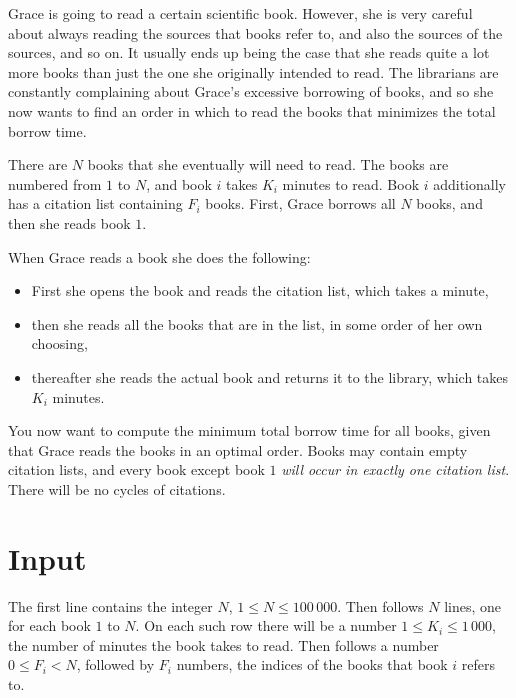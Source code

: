 
Grace is going to read a certain scientific book. However, she is very careful about always reading the sources that books refer to, and also the sources of the sources, and so on. It usually ends up being the case that she reads quite a lot more books than just the one she originally intended to read. The librarians are constantly complaining about Grace's excessive borrowing of books, and so she now wants to find an order in which to read the books that minimizes the total borrow time.

There are $N$ books that she eventually will need to read. The books are numbered from $1$ to $N$, and book $i$ takes $K_i$ minutes to read. Book $i$ additionally has a citation list containing $F_i$ books. First, Grace borrows all $N$ books, and then she reads book $1$.

When Grace reads a book she does the following:

\begin{itemize}
\item First she opens the book and reads the citation list, which takes a minute,
\item then she reads all the books that are in the list, in some order of her own choosing,
\item thereafter she reads the actual book and returns it to the library, which takes $K_i$ minutes.
\end{itemize}

You now want to compute the minimum total borrow time for all books, given that Grace reads the books in an optimal order. Books may contain empty citation lists, and every book except book $1$ {\em will occur in exactly one citation list}. There will be no cycles of citations.

\section*{Input}
The first line contains the integer $N$, $1 \leq N \leq 100\,000$. Then follows $N$ lines, one for each book $1$ to $N$. On each such row there will be a number $1 \leq K_i \leq 1\,000$, the number of minutes the book takes to read. Then follows a number $0 \leq F_i < N$, followed by $F_i$ numbers, the indices of the books that book $i$ refers to.

